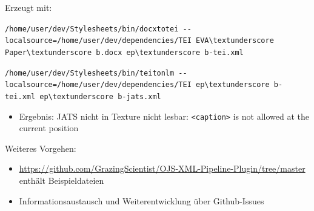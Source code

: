 \documentclass{article}
\begin{document}
Erzeugt mit:\par
\verb+/home/user/dev/Stylesheets/bin/docxtotei --localsource=/home/user/dev/dependencies/TEI EVA\textunderscore Paper\textunderscore b.docx ep\textunderscore b-tei.xml+\par
\verb+/home/user/dev/Stylesheets/bin/teitonlm --localsource=/home/user/dev/dependencies/TEI ep\textunderscore b-tei.xml ep\textunderscore b-jats.xml+
\begin{itemize}
\item Ergebnis: JATS nicht in Texture nicht lesbar: \verb+<caption>+ is not allowed at the current position
\end{itemize} \par
Weiteres Vorgehen:
\begin{itemize}
\item \url{https://github.com/GrazingScientist/OJS-XML-Pipeline-Plugin/tree/master} enthält Beispieldateien
\item Informationsaustausch und Weiterentwicklung über Github-Issues 
\end{itemize} 


%
%
\end{document}
